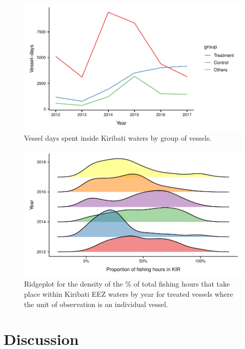 \documentclass[9pt,twoside,lineno]{pnas-new}
\begin{document}
\begin{figure}
\centering
	\includegraphics{img/PS_VDS_KIR_by_year.pdf}
	\caption{\label{fig:PS_VDS_KIR_by_year}Vessel days spent inside Kiribati waters by group of vessels.}
\end{figure}

\begin{figure}
\centering
	\includegraphics{img/hist_kir_fishing.pdf}
	\caption{\label{fig:hist_kir_fishing}Ridgeplot for the density of the \% of total fishing hours that take place within Kiribati EEZ waters by year for treated vessels where the unit of observation is an individual vessel.}
\end{figure}


\clearpage

\section{Discussion}\label{discussion}
\end{document}
